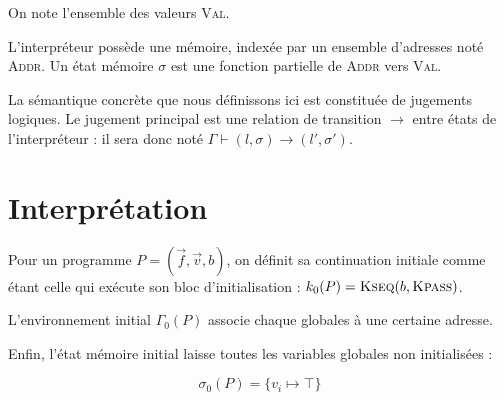 
On note l'ensemble des valeurs \textsc{Val}.

\begin{definition}
L'interpréteur possède une mémoire, indexée par un ensemble d'adresses noté
\textsc{Addr}. Un état mémoire $σ$ est une fonction partielle de \textsc{Addr}
vers \textsc{Val}.
\end{definition}


\begin{definition}
La sémantique concrète que nous définissons ici est constituée de jugements
logiques. Le jugement principal est une relation de transition $\rightarrow$
entre états de l'interpréteur : il sera donc noté $Γ ⊢ (l, σ) \rightarrow (l', σ')$.
\end{definition}

\section{Interprétation}

\begin{definition}

  Pour un programme $P = (\vec{f},\vec{v},b)$, on définit sa continuation
  initiale comme étant celle qui exécute son bloc d'initialisation : $k_0 (P) =
  \textsc{Kseq}(b, \textsc{Kpass})$.

  L'environnement initial $Γ_0(P)$ associe chaque globales à une certaine adresse.

  Enfin, l'état mémoire initial laisse toutes les variables globales non
  initialisées :

  \[ σ_0(P) = \{ v_i ↦ \top \} \]

\end{definition}

